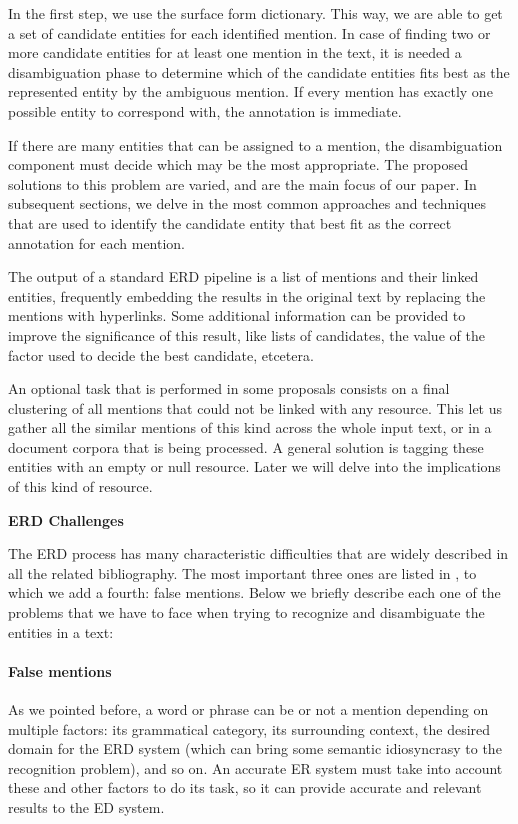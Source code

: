 In the first step, we use the surface form dictionary. This way, we are able to get a set of candidate entities for each identified mention. In case of finding two or more candidate entities for at least one mention in the text, it is needed a disambiguation phase to determine which of the candidate entities fits best as the represented entity by the ambiguous mention. If every mention has exactly one possible entity to correspond with, the annotation is immediate.

If there are many entities that can be assigned to a mention, the disambiguation component must decide which may be the most appropriate. The proposed solutions to this problem are varied, and are the main focus of our paper. In subsequent sections, we delve in the most common approaches and techniques that are used to identify the candidate entity that best fit as the correct annotation for each mention.

The output of a standard ERD pipeline is a list of mentions and their linked entities, frequently embedding the results in the original text by replacing the mentions with hyperlinks. Some additional information can be provided to improve the significance of this result, like lists of candidates, the value of the factor used to decide the best candidate, etcetera.

\medskip

An optional task that is performed in some proposals consists on a final clustering of all mentions that could not be linked with any resource. This let us gather all the similar mentions of this kind across the whole input text, or in a document corpora that is being processed. A general solution is tagging these entities with an empty or null resource. Later we will delve into the implications of this kind of resource.

\bigskip

\noindent\textbf{ERD Challenges}~

The ERD process has many characteristic difficulties that are widely described in all the related bibliography. The most important three ones are listed in \cite{rao2013}, to which we add a fourth: false mentions. Below we briefly describe each one of the problems that we have to face when trying to recognize and disambiguate the entities in a text:

\paragraph{False mentions} As we pointed before, a word or phrase can be or not a mention depending on multiple factors: its grammatical category, its surrounding context, the desired domain for the ERD system (which can bring some semantic idiosyncrasy to the recognition problem), and so on. An accurate ER system must take into account these and other factors to do its task, so it can provide accurate and relevant results to the ED system.

